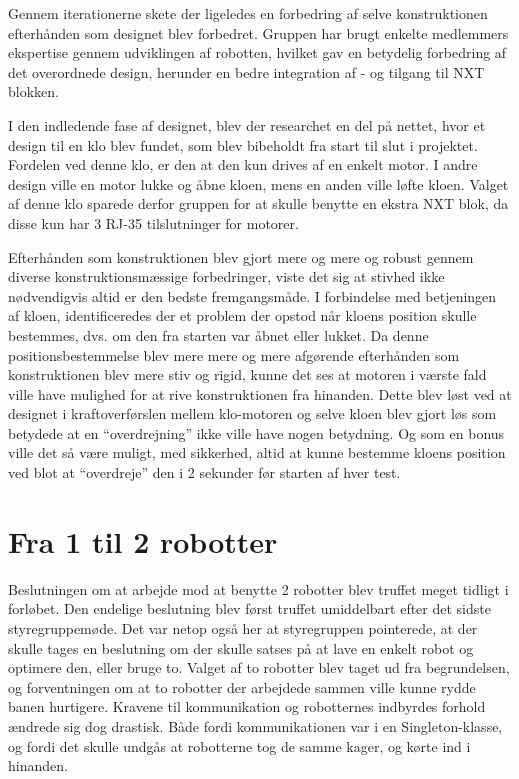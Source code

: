 Gennem iterationerne skete der ligeledes en forbedring af selve konstruktionen efterhånden som designet blev forbedret. Gruppen har brugt enkelte medlemmers ekspertise gennem udviklingen af robotten, hvilket gav en betydelig forbedring af det overordnede design, herunder en bedre integration af - og tilgang til NXT blokken.

I den indledende fase af designet, blev der researchet en del på nettet, hvor et design til en klo blev fundet, som blev bibeholdt fra start til slut i projektet. Fordelen ved denne klo, er den at den kun drives af en enkelt motor. I andre design ville en motor lukke og åbne kloen, mens en anden ville løfte kloen. Valget af denne klo sparede derfor gruppen for at skulle benytte en ekstra NXT blok, da disse kun har 3 RJ-35 tilslutninger for motorer.

Efterhånden som konstruktionen blev gjort mere og mere og robust gennem diverse konstruktionsmæssige forbedringer, viste det sig at stivhed ikke nødvendigvis altid er den bedste fremgangsmåde.
I forbindelse med betjeningen af kloen, identificeredes der et problem der opstod når kloens position skulle bestemmes, dvs. om den fra starten var åbnet eller lukket. Da denne positionsbestemmelse blev mere mere og mere afgørende efterhånden som konstruktionen blev mere stiv og rigid, kunne det ses at motoren i værste fald ville have mulighed for at rive konstruktionen fra hinanden. Dette blev løst ved at designet i kraftoverførslen mellem klo-motoren og selve kloen blev gjort løs som betydede at en "`overdrejning"' ikke ville have nogen betydning. Og som en bonus ville det så være muligt, med sikkerhed, altid at kunne bestemme kloens position ved blot at "`overdreje"' den i 2 sekunder før starten af hver test.

\section{Fra 1 til 2 robotter}
Beslutningen om at arbejde mod at benytte 2 robotter blev truffet meget tidligt i forløbet. Den endelige beslutning blev først truffet umiddelbart efter det sidste styregruppemøde. Det var netop også her at styregruppen pointerede, at der skulle tages en beslutning om der skulle satses på at lave en enkelt robot og optimere den, eller bruge to. Valget af to robotter blev taget ud fra begrundelsen, og forventningen om at to robotter der arbejdede sammen ville kunne rydde banen hurtigere. Kravene til kommunikation og robotternes indbyrdes forhold ændrede sig dog drastisk. Både fordi kommunikationen var i en Singleton-klasse, og fordi det skulle undgås at robotterne tog de samme kager, og kørte ind i hinanden.

